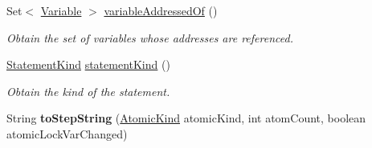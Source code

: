 \begin{DoxyCompactItemize}
Set$<$ \hyperlink{interfaceedu_1_1udel_1_1cis_1_1vsl_1_1civl_1_1model_1_1IF_1_1variable_1_1Variable}{Variable} $>$ \hyperlink{interfaceedu_1_1udel_1_1cis_1_1vsl_1_1civl_1_1model_1_1IF_1_1statement_1_1Statement_abe668e1bcb4297c9e6e7f8f65aeecfc2}{variable\+Addressed\+Of} ()
\begin{DoxyCompactList}\small\item\em Obtain the set of variables whose addresses are referenced. \end{DoxyCompactList}\item 
\hyperlink{enumedu_1_1udel_1_1cis_1_1vsl_1_1civl_1_1model_1_1IF_1_1statement_1_1Statement_1_1StatementKind}{Statement\+Kind} \hyperlink{interfaceedu_1_1udel_1_1cis_1_1vsl_1_1civl_1_1model_1_1IF_1_1statement_1_1Statement_a29ddc5542644ee105de4b551bdee6147}{statement\+Kind} ()
\begin{DoxyCompactList}\small\item\em Obtain the kind of the statement. \end{DoxyCompactList}\item 
\hypertarget{interfaceedu_1_1udel_1_1cis_1_1vsl_1_1civl_1_1model_1_1IF_1_1statement_1_1Statement_a2b44869c836185f39d950c6f705f416d}{}String {\bfseries to\+Step\+String} (\hyperlink{enumedu_1_1udel_1_1cis_1_1vsl_1_1civl_1_1model_1_1IF_1_1location_1_1Location_1_1AtomicKind}{Atomic\+Kind} atomic\+Kind, int atom\+Count, boolean atomic\+Lock\+Var\+Changed)\label{interfaceedu_1_1udel_1_1cis_1_1vsl_1_1civl_1_1model_1_1IF_1_1statement_1_1Statement_a2b44869c836185f39d950c6f705f416d}


\end{DoxyCompactItemize}
